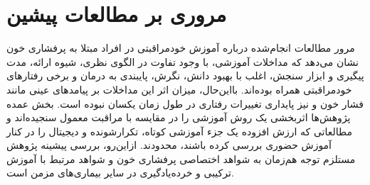 \section{مروری بر مطالعات پیشین}
\label{sec:previous-studies}
مرور مطالعات انجام‌شده درباره آموزش خودمراقبتی در افراد مبتلا به پرفشاری خون نشان می‌دهد که مداخلات آموزشی، با وجود تفاوت در الگوی نظری، شیوه ارائه، مدت پیگیری و ابزار سنجش، اغلب با بهبود دانش، نگرش، پایبندی به درمان و برخی رفتارهای خودمراقبتی همراه بوده‌اند. بااین‌حال، میزان اثر این مداخلات بر پیامدهای عینی مانند فشار خون و نیز پایداری تغییرات رفتاری در طول زمان یکسان نبوده است. بخش عمده پژوهش‌ها اثربخشی یک روش آموزشی را در مقایسه با مراقبت معمول سنجیده‌اند و مطالعاتی که ارزش افزوده یک جزء آموزشی کوتاه، تکرارشونده و دیجیتال را در کنار آموزش حضوری بررسی کرده باشند، محدودند. ازاین‌رو، بررسی پیشینه پژوهش مستلزم توجه هم‌زمان به شواهد اختصاصی پرفشاری خون و شواهد مرتبط با آموزش ترکیبی و خرده‌یادگیری در سایر بیماری‌های مزمن است.

